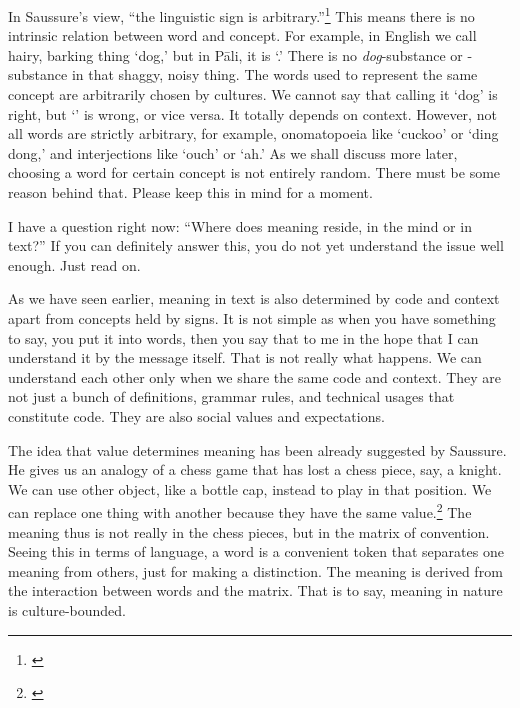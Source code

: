 In Saussure's view, ``the linguistic sign is arbitrary.''\footnote{\citealp[p.~67]{saussure:course}} This means there is no intrinsic relation between word and concept. For example, in English we call hairy, barking thing `dog,' but in P\=ali, it is `.' There is no \emph{dog}-substance or -substance in that shaggy, noisy thing. The words used to represent the same concept are arbitrarily chosen by cultures. We cannot say that calling it `dog' is right, but `' is wrong, or vice versa. It totally depends on context. However, not all words are strictly arbitrary, for example, onomatopoeia like `cuckoo' or `ding dong,' and interjections like `ouch' or `ah.' As we shall discuss more later, choosing a word for certain concept is not entirely random. There must be some reason behind that. Please keep this in mind for a moment.

I have a question right now: ``Where does meaning reside, in the mind or in text?'' If you can definitely answer this, you do not yet understand the issue well enough. Just read on.

As we have seen earlier, meaning in text is also determined by code and context apart from concepts held by signs. It is not simple as when you have something to say, you put it into words, then you say that to me in the hope that I can understand it by the message itself. That is not really what happens. We can understand each other only when we share the same code and context. They are not just a bunch of definitions, grammar rules, and technical usages that constitute code. They are also social values and expectations.

The idea that value determines meaning has been already suggested by Saussure. He gives us an analogy of a chess game that has lost a chess piece, say, a knight. We can use other object, like a bottle cap, instead to play in that position. We can replace one thing with another because they have the same value.\footnote{\citealp[p.~110]{saussure:course}} The meaning thus is not really in the chess pieces, but in the matrix of convention. Seeing this in terms of language, a word is a convenient token that separates one meaning from others, just for making a distinction. The meaning is derived from the interaction between words and the matrix. That is to say, meaning in nature is culture-bounded.

